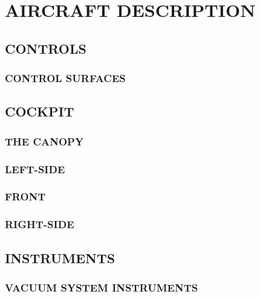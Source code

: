\chapter{AIRCRAFT DESCRIPTION}
\minitoc{}
\cleardoublepage{}


\section{CONTROLS}
\subsection{CONTROL SURFACES}


\section{COCKPIT}
\subsection{THE CANOPY}
\subsection{LEFT-SIDE}
\subsection{FRONT}
\subsection{RIGHT-SIDE}


\section{INSTRUMENTS}
\subsection{VACUUM SYSTEM INSTRUMENTS}
